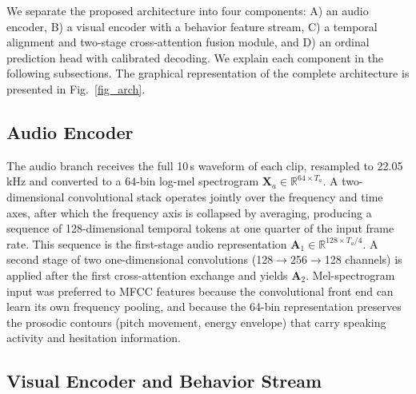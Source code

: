 \documentclass[journal]{IEEEtran}
\begin{document}
We separate the proposed architecture into four components: A) an audio encoder, B) a visual encoder with a behavior feature stream, C) a temporal alignment and two-stage cross-attention fusion module, and D) an ordinal prediction head with calibrated decoding. We explain each component in the following subsections. The graphical representation of the complete architecture is presented in Fig.~\ref{fig_arch}.


\subsection{Audio Encoder}

The audio branch receives the full 10\,s waveform of each clip, resampled to 22.05\,kHz and converted to a 64-bin log-mel spectrogram $\mathbf{X}_a \in \mathbb{R}^{64 \times T_a}$. A two-dimensional convolutional stack operates jointly over the frequency and time axes, after which the frequency axis is collapsed by averaging, producing a sequence of 128-dimensional temporal tokens at one quarter of the input frame rate. This sequence is the first-stage audio representation $\mathbf{A}_1 \in \mathbb{R}^{128 \times T_a/4}$. A second stage of two one-dimensional convolutions (128$\to$256$\to$128 channels) is applied after the first cross-attention exchange and yields $\mathbf{A}_2$. Mel-spectrogram input was preferred to MFCC features because the convolutional front end can learn its own frequency pooling, and because the 64-bin representation preserves the prosodic contours (pitch movement, energy envelope) that carry speaking activity and hesitation information.

\subsection{Visual Encoder and Behavior Stream}
\end{document}
